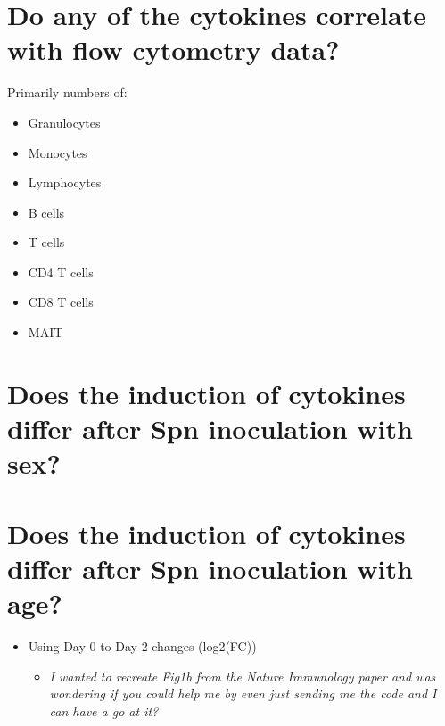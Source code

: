 \documentclass[
]{book}
\providecommand{\tightlist}{%
  \setlength{\itemsep}{0pt}\setlength{\parskip}{0pt}}
\begin{document}
\hypertarget{do-any-of-the-cytokines-correlate-with-flow-cytometry-data}{%
\section{Do any of the cytokines correlate with flow cytometry data?}\label{do-any-of-the-cytokines-correlate-with-flow-cytometry-data}}

Primarily numbers of:

\begin{itemize}
\item
  Granulocytes
\item
  Monocytes
\item
  Lymphocytes
\item
  B cells
\item
  T cells
\item
  CD4 T cells
\item
  CD8 T cells
\item
  MAIT
\end{itemize}

\hypertarget{does-the-induction-of-cytokines-differ-after-spn-inoculation-with-sex}{%
\section{Does the induction of cytokines differ after Spn inoculation with sex?}\label{does-the-induction-of-cytokines-differ-after-spn-inoculation-with-sex}}

\hypertarget{does-the-induction-of-cytokines-differ-after-spn-inoculation-with-age}{%
\section{Does the induction of cytokines differ after Spn inoculation with age?}\label{does-the-induction-of-cytokines-differ-after-spn-inoculation-with-age}}

\begin{itemize}
\item
  Using Day 0 to Day 2 changes (log2(FC))

  \begin{itemize}
  \tightlist
  \item
    \emph{I wanted to recreate Fig1b from the Nature Immunology paper and was wondering if you could help me by even just sending me the code and I can have a go at it?}
  \end{itemize}
\end{itemize}
\end{document}

